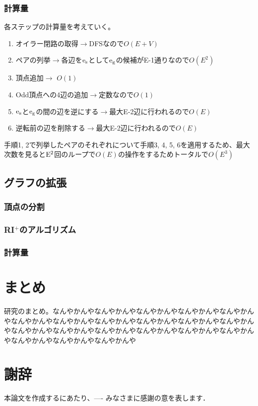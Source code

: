 \documentclass[11pt,a4j]{jreport}
\newcommand{\riplus}{RI${}^\text{+}$}
\newcommand{\fl}[1]{$\rm{#1}$}
\begin{document}
\subsection{計算量}
各ステップの計算量を考えていく。

\begin{enumerate}
    \item オイラー閉路の取得$\rightarrow$DFSなので$O(E+V)$
    \item ペアの列挙$\rightarrow$各辺を\fl{e_s}として\fl{e_g}の候補がE-1通りなので$O(E^2)$
    \item 頂点追加$\rightarrow$ $O(1)$
    \item Odd頂点への4辺の追加$\rightarrow$定数なので$O(1)$
    \item \fl{e_s}と\fl{e_g}の間の辺を逆にする$\rightarrow$最大E-2辺に行われるので$O(E)$
    \item 逆転前の辺を削除する$\rightarrow$最大E-2辺に行われるので$O(E)$
\end{enumerate}

手順1, 2で列挙したペアのそれぞれについて手順3, 4, 5, 6を適用するため、最大次数を見ると\fl{E^2}回のループで$O(E)$の操作をするためトータルで$O(E^3)$


\section{グラフの拡張}
\subsection{頂点の分割}
\subsection{\riplus のアルゴリズム}
\subsection{計算量}

\chapter{まとめ}
研究のまとめ。なんやかんやなんやかんやなんやかんやなんやかんやなんやかんやなんやかんやなんやかんやなんやかんやなんやかんやなんやかんやなんやかんやなんやかんやなんやかんやなんやかんやなんやかんやなんやかんやなんやかんやなんやかんやなんやかんやなんやかんや

\chapter*{謝辞} %
本論文を作成するにあたり、---- みなさまに感謝の意を表します．
\end{document}
